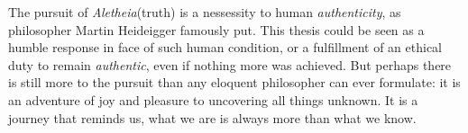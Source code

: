 The pursuit of \textit{Aletheia}(truth) is a nessessity to human \textit{authenticity}, as philosopher Martin Heideigger famously put. This thesis could be seen as a humble response in face of such human condition, or a fulfillment of an ethical duty to remain \textit{authentic}, even if nothing more was achieved. But perhaps there is still more to the pursuit than any eloquent philosopher can ever formulate: it is an adventure of
joy and pleasure to uncovering all things unknown. It is a journey that reminds us, what we are is always more than what we know.












